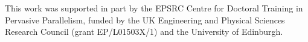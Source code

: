 This work was supported in part by the EPSRC Centre for Doctoral Training in Pervasive Parallelism, funded by the UK Engineering and Physical Sciences Research Council (grant EP/L01503X/1) and the University of Edinburgh.
